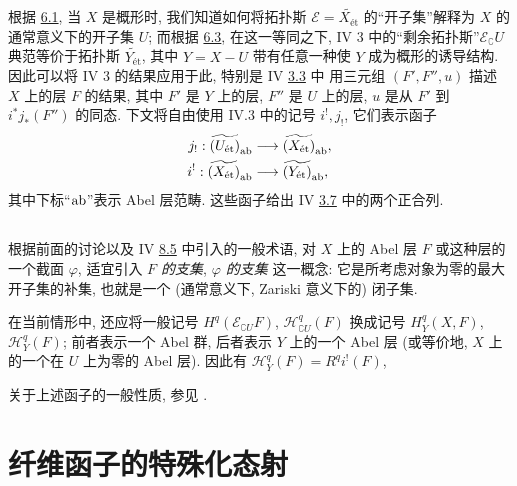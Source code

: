 根据 \hyperref[VIII.prop6.1]{6.1},
当 $X$ 是概形时, 我们知道如何将拓扑斯
$ℰ = \widetilde{X_{\text{ét}}}$ 的“开子集”解释为
$X$ 的通常意义下的开子集 $U$;
而根据 \hyperref[VIII.thm6.3]{6.3},
在这一等同之下, IV 3 中的“剩余拓扑斯”\pageoriginale $ℰ_\complement U$
典范等价于拓扑斯 $\widetilde{Y_{\text{ét}}}$,
其中 $Y = X - U$ 带有任意一种使 $Y$ 成为概形的诱导结构.
因此可以将 IV 3 的结果应用于此,
特别是 IV \hyperref[IV.theo9.5.4]{3.3} 中
用三元组 $(F', F'', u)$ 描述 $X$ 上的层 $F$ 的结果,
其中 $F'$ 是 $Y$ 上的层, $F''$ 是 $U$ 上的层,
$u$ 是从 $F'$ 到 $i^{\ast} j_{\ast} (F'')$ 的同态.
下文将自由使用 IV.3 中的记号 $i^{!}, j_{!}$, 它们表示函子
\begin{align*}
j_{!} : \widetilde{(U_{\text{ét}})}_{\ab} &\to
\widetilde{(X_{\text{ét}})}_{\ab}{\quoi},\\
i^{!} : \widetilde{(X_{\text{ét}})}_{\ab} &\to
\widetilde{(Y_{\text{ét}})}_{\ab}{\quoi},
\end{align*}
其中下标“$\operatorname{ab}$”表示 Abel 层范畴.
这些函子给出 IV \hyperref[IV.prop14.6]{3.7} 中的两个正合列.

\subsection{}

根据前面的讨论以及 IV \hyperref[IV.subsec8.5]{8.5} 中引入的一般术语,
对 $X$ 上的 Abel 层 $F$ 或这种层的一个截面 $\varphi$,
适宜引入 \emph{$F$ 的支集}, \resp \emph{$\varphi$ 的支集} 这一概念:
它是所考虑对象为零的最大开子集的补集,
也就是一个 (通常意义下, \ie Zariski 意义下的) 闭子集.

在当前情形中, 还应将一般记号
 $H^q (ℰ_{\complement U} F)$,
$ℋ^q_{\complement U} (F)$ 换成记号 $H^{q}_Y (X, F)$,
$ℋ^{q}_Y (F)$;
前者表示一个 Abel 群, 后者表示 $Y$ 上的一个 Abel 层
(或等价地, $X$ 上的一个在 $U$ 上为零的 Abel 层).
因此有 $\mathcal H^q_Y(F)=R^q i^!(F)$, \etc

关于上述函子的一般性质, 参见 .

\section{纤维函子的特殊化态射}\pageoriginale
{}

\subsection{}

